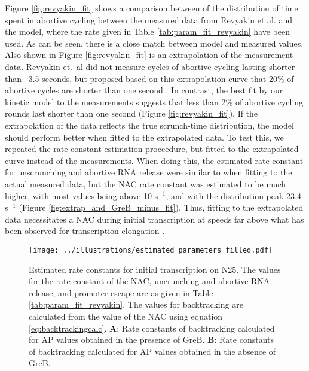 Figure \ref{fig:revyakin_fit} shows a comparison between of the distribution
of time spent in abortive cycling between the measured data from Revyakin et
al. \cite{revyakin_abortive_2006} and the model, where the rate given in Table
\ref{tab:param_fit_revyakin} have been used. As can be seen, there is a close
match between model and measured values. Also shown in Figure
\ref{fig:revyakin_fit} is an extrapolation of the measurement data. Revyakin
et.\ al did not measure cycles of abortive cycling lasting shorter than ~3.5
seconds, but proposed based on this extrapolation curve that 20\% of abortive
cycles are shorter than one second \cite{revyakin_abortive_2006}. In contrast,
the best fit by our kinetic model to the measurements suggests that less than
2\% of abortive cycling rounds last shorter than one second (Figure
\ref{fig:revyakin_fit}). If the extrapolation of the data reflects the true
scrunch-time distribution, the model should perform better when fitted to the
extrapolated data. To test this, we repeated the rate constant estimation
proceedure, but fitted to the extrapolated curve instead of the measurements.
When doing this, the estimated rate constant for unscrunching and
abortive RNA release were similar to when fitting to the actual measured data,
but the NAC rate constant was estimated to be much higher, with most values
being above 10 s$^{-1}$, and with the distribution peak 23.4 s$^{-1}$ (Figure
\ref{fig:extrap_and_GreB_minus_fit}). Thus, fitting to the extrapolated data
necessitates a NAC during initial transcription at speeds far above what has
been observed for transcription elongation \cite{revyakin_abortive_2006}. 

\begin{figure}
	\begin{center}
      \texttt{[image: ../illustrations/estimated\_parameters\_filled.pdf]}
	\end{center}
    \caption{Estimated rate constants for initial transcription on N25. The
      values for the rate constant of the NAC, uncrunching and abortive RNA
      release, and promoter escape are as given in Table
      \ref{tab:param_fit_revyakin}. The values for backtracking are calculated
      from the value of the NAC using equation \eqref{eq:backtrackingcalc}.
      \textbf{A}: Rate constants of backtracking calculated for AP values
      obtained in the presence of GreB. \textbf{B}: Rate constants of
      backtracking calculated for AP values obtained in the absence of GreB. }
    \label{fig:estimated_parameters}
\end{figure}

